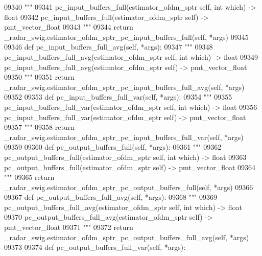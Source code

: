 \begin{DoxyCode}
{{{{{{{{{{{{{{{{{{{{{{{{{{{{{{09340         \textcolor{stringliteral}{"""}
09341 \textcolor{stringliteral}{        pc\_input\_buffers\_full(estimator\_ofdm\_sptr self, int which) -> float}
09342 \textcolor{stringliteral}{        pc\_input\_buffers\_full(estimator\_ofdm\_sptr self) -> pmt\_vector\_float}
09343 \textcolor{stringliteral}{        """}
09344         \textcolor{keywordflow}{return} \_radar\_swig.estimator\_ofdm\_sptr\_pc\_input\_buffers\_full(self, *args)
09345 
09346     \textcolor{keyword}{def }pc_input_buffers_full_avg(self, *args):
09347         \textcolor{stringliteral}{"""}
09348 \textcolor{stringliteral}{        pc\_input\_buffers\_full\_avg(estimator\_ofdm\_sptr self, int which) -> float}
09349 \textcolor{stringliteral}{        pc\_input\_buffers\_full\_avg(estimator\_ofdm\_sptr self) -> pmt\_vector\_float}
09350 \textcolor{stringliteral}{        """}
09351         \textcolor{keywordflow}{return} \_radar\_swig.estimator\_ofdm\_sptr\_pc\_input\_buffers\_full\_avg(self, *args)
09352 
09353     \textcolor{keyword}{def }pc_input_buffers_full_var(self, *args):
09354         \textcolor{stringliteral}{"""}
09355 \textcolor{stringliteral}{        pc\_input\_buffers\_full\_var(estimator\_ofdm\_sptr self, int which) -> float}
09356 \textcolor{stringliteral}{        pc\_input\_buffers\_full\_var(estimator\_ofdm\_sptr self) -> pmt\_vector\_float}
09357 \textcolor{stringliteral}{        """}
09358         \textcolor{keywordflow}{return} \_radar\_swig.estimator\_ofdm\_sptr\_pc\_input\_buffers\_full\_var(self, *args)
09359 
09360     \textcolor{keyword}{def }pc_output_buffers_full(self, *args):
09361         \textcolor{stringliteral}{"""}
09362 \textcolor{stringliteral}{        pc\_output\_buffers\_full(estimator\_ofdm\_sptr self, int which) -> float}
09363 \textcolor{stringliteral}{        pc\_output\_buffers\_full(estimator\_ofdm\_sptr self) -> pmt\_vector\_float}
09364 \textcolor{stringliteral}{        """}
09365         \textcolor{keywordflow}{return} \_radar\_swig.estimator\_ofdm\_sptr\_pc\_output\_buffers\_full(self, *args)
09366 
09367     \textcolor{keyword}{def }pc_output_buffers_full_avg(self, *args):
09368         \textcolor{stringliteral}{"""}
09369 \textcolor{stringliteral}{        pc\_output\_buffers\_full\_avg(estimator\_ofdm\_sptr self, int which) -> float}
09370 \textcolor{stringliteral}{        pc\_output\_buffers\_full\_avg(estimator\_ofdm\_sptr self) -> pmt\_vector\_float}
09371 \textcolor{stringliteral}{        """}
09372         \textcolor{keywordflow}{return} \_radar\_swig.estimator\_ofdm\_sptr\_pc\_output\_buffers\_full\_avg(self, *args)
09373 
09374     \textcolor{keyword}{def }pc_output_buffers_full_var(self, *args):
}}}}}}}}}}}}}}}}}}}}}}}}}}}}}}
\end{DoxyCode}
